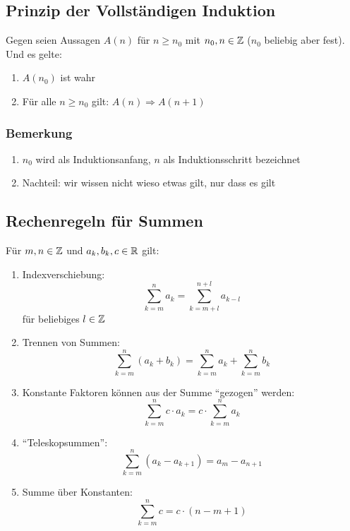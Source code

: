 \subsection{Prinzip der Vollständigen Induktion}
Gegen seien Aussagen $A(n)$ für $n \geq n_0$ mit $n_0, n \in \mathbb{Z}$
($n_0$ beliebig aber fest). Und es gelte:
\begin{enumerate}[label= (\alph*)]
    \item $A(n_0)$ ist wahr
    \item Für alle $n \geq n_0$ gilt: $A(n) \Rightarrow A(n+1)$
\end{enumerate}

\subsubsection{Bemerkung}
\begin{enumerate}[label= (\alph*)]
    \item $n_0$ wird als Induktionsanfang, $n$ als Induktionsschritt bezeichnet
    \item Nachteil: wir wissen nicht wieso etwas gilt, nur dass es gilt
\end{enumerate}

\subsection{Rechenregeln für Summen}
Für $m,n \in \mathbb{Z}$ und $a_k, b_k, c \in \mathbb{R}$ gilt:
\begin{enumerate}[label= (\alph*)]
    \item Indexverschiebung:
        \begin{equation*}
            \sum_{k=m}^n a_k = \sum_{k=m+l}^{n+l} a_{k-l}
        \end{equation*}
        für beliebiges $l \in \mathbb{Z}$
    \item Trennen von Summen:
        \begin{equation*}
            \sum_{k=m}^n (a_k + b_k) = \sum_{k=m}^n a_k + \sum_{k=m}^n b_k
        \end{equation*}
    \item Konstante Faktoren können aus der Summe ``gezogen'' werden:
        \begin{equation*}
            \sum_{k=m}^n c \cdot a_k = c \cdot \sum_{k=m}^n a_k
        \end{equation*}
    \item ``Teleskopsummen'':
        \begin{equation*}
            \sum_{k=m}^n (a_k - a_{k+1}) = a_m - a_{n+1}
        \end{equation*}
    \item Summe über Konstanten:
        \begin{equation*}
            \sum_{k=m}^n c = c \cdot (n-m+1)
        \end{equation*}
\end{enumerate}

